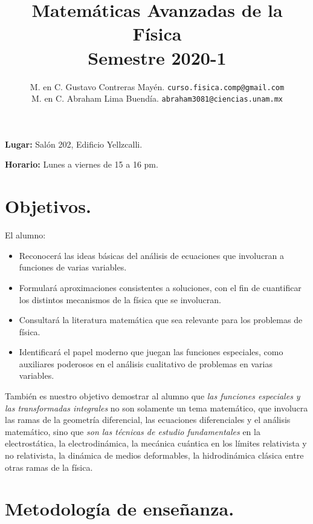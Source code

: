 \documentclass[12pt]{article}
\author{M. en C. Gustavo Contreras Mayén. \texttt{curso.fisica.comp@gmail.com}\\
M. en C. Abraham Lima Buendía. \texttt{abraham3081@ciencias.unam.mx}}
\title{Matemáticas Avanzadas de la Física \\ {\large Semestre 2020-1}}
\date{ }
\begin{document}
\vspace{-4cm}
\renewcommand\labelenumii{\theenumi.{\arabic{enumii}}}
\maketitle
\fontsize{14}{14}\selectfont
\textbf{Lugar: } Salón 202, Edificio Yellzcalli.
\par
\textbf{Horario: } Lunes a viernes de 15 a 16 pm.
\section{Objetivos.}
El alumno:
\begin{itemize}
\setlength{\itemsep}{0mm}
\item Reconocerá las ideas básicas del análisis de ecuaciones que involucran a funciones de varias variables.
\item Formulará aproximaciones consistentes a soluciones, con el fin de cuantificar los distintos mecanismos de la física que se involucran.
\item Consultará la literatura matemática que sea relevante para los problemas de física.
\item Identificará el papel moderno que juegan las funciones especiales, como auxiliares poderosos en el análisis cualitativo de problemas en varias variables.
\end{itemize}
También es nuestro objetivo demostrar al alumno que \emph{las funciones especiales y las transformadas integrales} no son solamente un tema matemático, que involucra las ramas de la geometría diferencial, las ecuaciones diferenciales y el análisis matemático, sino que \emph{son las técnicas de estudio fundamentales} en la electrostática, la electrodinámica, la mecánica cuántica en los límites relativista y no relativista, la dinámica de medios deformables, la hidrodinámica clásica entre otras ramas de la física.
\section{Metodología de enseñanza.}
\end{document}
